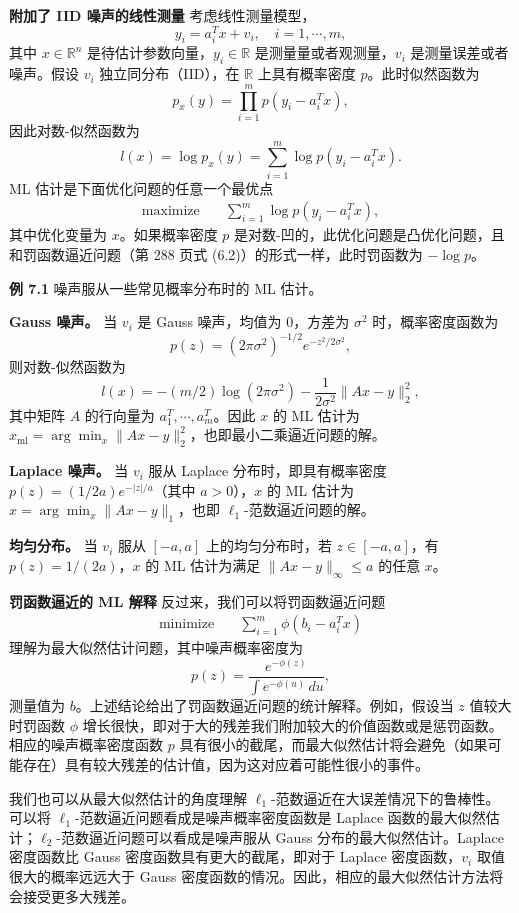 \documentclass[UTF8, 12pt, fontset=fandol, oneside]{ctexart}
\begin{document}
\noindent\textbf{附加了 IID 噪声的线性测量}\quad
考虑线性测量模型，
\[
y_i=a_i^T x+v_i,\quad i=1,\cdots,m,
\]
其中 $x\in\mathbb{R}^n$ 是待估计参数向量，$y_i\in\mathbb{R}$ 是测量量或者观测量，$v_i$ 是测量误差或者噪声。假设 $v_i$ 独立同分布（IID），在 $\mathbb{R}$ 上具有概率密度 $p$。此时似然函数为
\[
p_x(y)=\prod_{i=1}^m p(y_i-a_i^T x),
\]
因此对数-似然函数为
\[
l(x)=\log p_x(y)=\sum_{i=1}^m \log p(y_i-a_i^T x).
\]
ML 估计是下面优化问题的任意一个最优点
\begin{equation}
\begin{aligned}
\text{maximize}\quad & \sum_{i=1}^m \log p(y_i-a_i^T x),
\end{aligned}
\tag{7.2}
\end{equation}
其中优化变量为 $x$。如果概率密度 $p$ 是对数-凹的，此优化问题是凸优化问题，且和罚函数逼近问题（第 288 页式 (6.2)）的形式一样，此时罚函数为 $-\log p$。

\noindent\textbf{例 7.1}\quad
噪声服从一些常见概率分布时的 ML 估计。

\noindent\textbf{Gauss 噪声。}\quad
当 $v_i$ 是 Gauss 噪声，均值为 $0$，方差为 $\sigma^2$ 时，概率密度函数为
\[
p(z)=(2\pi\sigma^2)^{-1/2}e^{-z^2/2\sigma^2},
\]
则对数-似然函数为
\[
l(x)=-(m/2)\log(2\pi\sigma^2)-\frac{1}{2\sigma^2}\|Ax-y\|_2^2,
\]
其中矩阵 $A$ 的行向量为 $a_1^T,\cdots,a_m^T$。因此 $x$ 的 ML 估计为 $x_{\mathrm{ml}}=\arg\min_x\|Ax-y\|_2^2$，也即最小二乘逼近问题的解。

\noindent\textbf{Laplace 噪声。}\quad
当 $v_i$ 服从 Laplace 分布时，即具有概率密度 $p(z)=(1/2a)e^{-|z|/a}$（其中 $a>0$），$x$ 的 ML 估计为 $\hat{x}=\arg\min_x\|Ax-y\|_1$，也即 $\ell_1$-范数逼近问题的解。

\noindent\textbf{均匀分布。}\quad
当 $v_i$ 服从 $[-a,a]$ 上的均匀分布时，若 $z\in[-a,a]$，有 $p(z)=1/(2a)$，$x$ 的 ML 估计为满足 $\|Ax-y\|_\infty\leq a$ 的任意 $x$。

\noindent\textbf{罚函数逼近的 ML 解释}\quad
反过来，我们可以将罚函数逼近问题
\[
\begin{aligned}
\text{minimize}\quad & \sum_{i=1}^m \phi(b_i-a_i^T x)
\end{aligned}
\]
理解为最大似然估计问题，其中噪声概率密度为
\[
p(z)=\frac{e^{-\phi(z)}}{\int e^{-\phi(u)}\,du},
\]
测量值为 $b$。上述结论给出了罚函数逼近问题的统计解释。例如，假设当 $z$ 值较大时罚函数 $\phi$ 增长很快，即对于大的残差我们附加较大的价值函数或是惩罚函数。相应的噪声概率密度函数 $p$ 具有很小的截尾，而最大似然估计将会避免（如果可能存在）具有较大残差的估计值，因为这对应着可能性很小的事件。

我们也可以从最大似然估计的角度理解 $\ell_1$-范数逼近在大误差情况下的鲁棒性。可以将 $\ell_1$-范数逼近问题看成是噪声概率密度函数是 Laplace 函数的最大似然估计；$\ell_2$-范数逼近问题可以看成是噪声服从 Gauss 分布的最大似然估计。Laplace 密度函数比 Gauss 密度函数具有更大的截尾，即对于 Laplace 密度函数，$v_i$ 取值很大的概率远远大于 Gauss 密度函数的情况。因此，相应的最大似然估计方法将会接受更多大残差。
\end{document}
